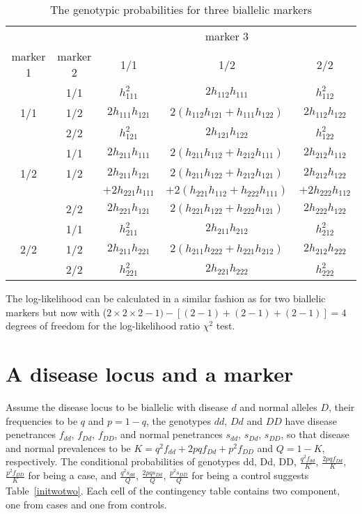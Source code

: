 \begin{table}[h]
\centering
\caption{The genotypic probabilities for three biallelic markers\label{ththmg}}
\vskip 0.3cm
\begin{tabular}{ccccc}
\hline
   & & \multicolumn{3}{c}{marker 3} \\ \cline{3-5}
marker 1&marker 2 & 1/1 & 1/2 & 2/2 \\
\hline
   & 1/1 &   $h_{111}^2$ &
             $2 h_{112} h_{111}$ &
             $h_{112}^2$ \\
1/1& 1/2 &   $2 h_{111} h_{121}$ &
             $2 (h_{112} h_{121}+h_{111} h_{122})$ &
             $2 h_{112} h_{122}$ \\
   & 2/2 &   $h_{121}^2$ &
             $2 h_{121} h_{122}$ &
             $h_{122}^2$ \\
   & 1/1 &   $2 h_{211} h_{111}$ &
             $2 (h_{211} h_{112}+h_{212} h_{111})$ &
             $2 h_{212} h_{112}$ \\
1/2& 1/2 &   $2 h_{211} h_{121}$ &
             $2 (h_{211} h_{122}+h_{212} h_{121})$ &
             $2 h_{212} h_{122}$ \\
          && $+2 h_{221} h_{111}$&
             $+2 (h_{221} h_{112}+h_{222} h_{111})$ &
             $+2 h_{222} h_{112}$\\
   & 2/2 &   $2 h_{221} h_{121}$  &
             $2 (h_{221} h_{122}+h_{222} h_{121})$ &
             $2 h_{222} h_{122}$ \\
   & 1/1 &   $h_{211}^2$  &
             $2 h_{211} h_{212}$ &
             $h_{212}^2$  \\
2/2& 1/2 &   $2 h_{211} h_{221}$ &
             $2 (h_{211} h_{222}+h_{221} h_{212})$ &
             $2 h_{212} h_{222}$ \\
   & 2/2 &   $h_{221}^2$ &
             $2 h_{221} h_{222}$ &
             $h_{222}^2$ \\
\hline
\end{tabular}
\end{table}

The log-likelihood can be calculated in a similar fashion as for two biallelic
markers but now with ($2\times 2\times 2-1)-[(2-1)+(2-1)+(2-1)]=4$ degrees of
freedom for the log-likelihood ratio $\chi^2$ test.

\section*{A disease locus and a marker}

Assume the disease locus to be biallelic with disease $d$ and normal alleles
$D$, their frequencies to be $q$ and $p=1-q$, the genotypes $dd$, $Dd$ and $DD$
have disease penetrances $f_{dd}$, $f_{Dd}$, $f_{DD}$, and normal penetrances
$s_{dd}$, $s_{Dd}$, $s_{DD}$, so that disease and normal prevalences to be
$K=q^2f_{dd}+2pqf_{Dd}+p^2f_{DD}$ and $Q=1-K$, respectively.  The conditional
probabilities of genotypes dd, Dd, DD, $\frac{q^2f_{dd}}{K}$,
$\frac{2pqf_{Dd}}{K}$, $\frac{p^2f_{DD}}{K}$ for being a case, and
$\frac{q^2s_{dd}}{Q}$, $\frac{2pqs_{Dd}}{Q}$, $\frac{p^2s_{DD}}{Q}$ for being
a control suggests Table~\ref{initwotwo}.  Each cell of the contingency table
contains two component, one from cases and one from controls.

